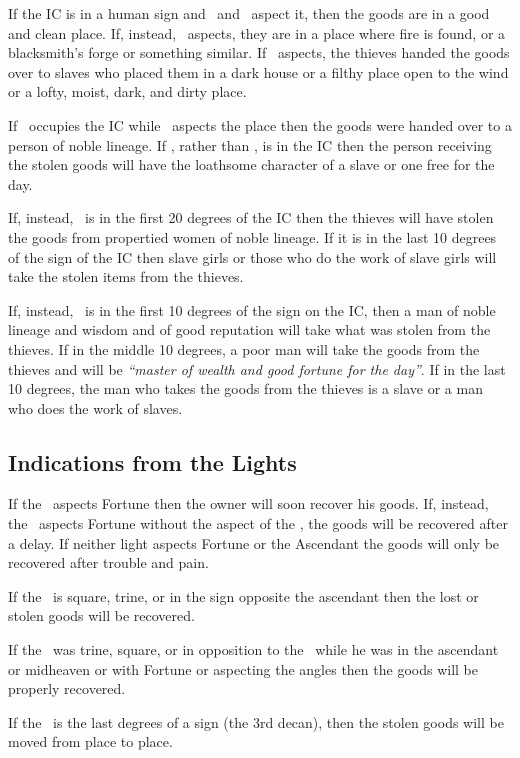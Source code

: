 If the IC is in a human sign and \Jupiter\, and \Venus\, aspect it, then the goods are in a good and clean place. If, instead, \Mars\, aspects, they are in a place where fire is found, or a blacksmith's forge or something similar. If \Saturn\, aspects, the thieves handed the goods over to slaves who placed them in a dark house or a filthy place open to the wind or a lofty, moist, dark, and dirty place.

If \Jupiter\, occupies the IC while \Saturn\, aspects the place then the goods were handed over to a person of noble lineage. If \Mars, rather than \Jupiter, is in the IC then the person receiving the stolen goods will have the loathsome character of a slave or one free for the day. 

If, instead, \Venus\, is in the first 20 degrees of the IC then the thieves will have stolen the goods from propertied women of noble lineage. If it is in the last 10 degrees of the sign of the IC then slave girls or those who do the work of slave girls will take the stolen items from the thieves.

If, instead, \Mercury\, is in the first 10 degrees of the sign on the IC, then a man of noble lineage and wisdom and of good reputation will take what was stolen from the thieves. If in the middle 10 degrees, a poor man will take the goods from the thieves and will be \textsl{``master of wealth and good fortune for the day''}. If in the last 10 degrees, the man who takes the goods from the thieves is a slave or a man who does the work of slaves.

\subsection{Indications from the Lights}
If the \Sun\, aspects Fortune then the owner will soon recover his goods. If, instead, the \Moon\, aspects Fortune without the aspect of the \Sun, the goods will be recovered after a delay. If neither light aspects Fortune or the Ascendant the goods will only be recovered after trouble and pain.

If the \Moon\, is square, trine, or in the sign opposite the ascendant then the lost or stolen goods will be recovered. 

If the \Sun\,  was trine, square, or in opposition to the \Moon\, while he was in the ascendant or midheaven or with Fortune or aspecting the angles then the goods will be properly recovered. 

If the \Moon\, is the last degrees of a sign (the 3rd decan), then the stolen goods will be moved from place to place.

